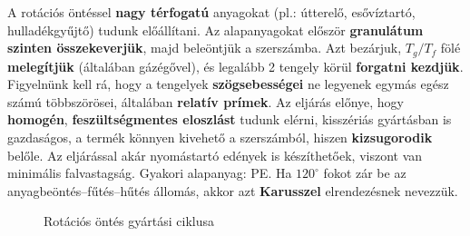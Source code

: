 \documentclass[12pt,a4paper]{article}       %
\newcounter{questionctr}
\newenvironment{question}[1]{
  \refstepcounter{questionctr}
  \begin{tcolorbox}[
    colback=gray!25,
    colbacktitle=red!10!yellow!50,
    enhanced,
    sharp corners,
    boxrule=0mm,
    frame hidden,
    breakable,
    enhanced jigsaw,
    title={\textcolor{black}{\textsc{\# \thequestionctr{} – #1}}}
  ]


}{\end{tcolorbox}}
\begin{document}
\begin{question}{
    Mutassa be részletesen a rotációs öntés technológiáját (alapanyagok,
    szerszám kialakítása, a gép működése, rotációs öntési ciklus stb.).
  }
  A rotációs öntéssel \textbf{nagy térfogatú} anyagokat (pl.: útterelő,
  esővíztartó, hulladékgyűjtő) tudunk előállítani. Az alapanyagokat először
  \textbf{granulátum szinten összekeverjük}, majd beleöntjük a szerszámba.
  Azt bezárjuk, $T_g / T_f$ fölé \textbf{melegítjük} (általában gázégővel), és
  legalább 2 tengely körül \textbf{forgatni kezdjük}. Figyelnünk kell rá, hogy
  a tengelyek \textbf{szögsebességei} ne legyenek egymás egész számú
  többszörösei, általában \textbf{relatív prímek}. Az eljárás előnye, hogy
  \textbf{homogén}, \textbf{feszültségmentes eloszlást} tudunk elérni,
  kisszériás gyártásban is gazdaságos, a termék könnyen kivehető a szerszámból,
  hiszen \textbf{kizsugorodik} belőle. Az eljárással akár nyomástartó edények
  is készíthetőek, viszont van minimális falvastagság. Gyakori alapanyag: PE.
  Ha $120^\circ$ fokot zár be az anyagbeöntés–fűtés–hűtés állomás, akkor azt
  \textbf{Karusszel} elrendezésnek nevezzük.
  \begin{figure}[H]
    \centering
    \caption{Rotációs öntés gyártási ciklusa}
    \label{fig:rot}
  \end{figure}
\end{question}
\end{document}
